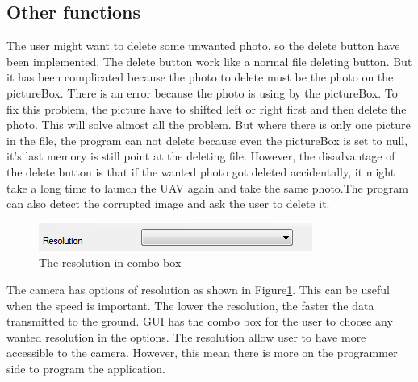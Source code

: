 \subsection{Other functions}
The user might want to delete some unwanted photo, so the delete button have been implemented. The delete button work like a normal file deleting button. But it has been complicated because the photo to delete must be the photo on the pictureBox. There is an error because the photo is using by the pictureBox. To fix this problem, the picture have to shifted left or right first and then delete the photo. This will solve almost all the problem. But where there is only one picture in the file, the program can not delete because even the pictureBox is set to null, it's last memory is still point at the deleting file. However, the disadvantage of the delete button is that if the wanted photo got deleted accidentally, it might take a long time to launch the UAV again and take the same photo.The program can also detect the corrupted image and ask the user to delete it.

\begin{figure}[H]
\begin{center}
\includegraphics[scale=1]{figures/resolutionOption.png} 
\end{center}
\caption{The resolution in combo box\label{resolutionOption}}
\end{figure}
The camera has options of resolution as shown in Figure\ref{resolutionOption}. This can be useful when the speed is important. The lower the resolution, the faster the data transmitted to the ground. GUI has the combo box for the user to choose any wanted resolution in the options. The resolution allow user to have more accessible to the camera. However, this mean there is more on the programmer side to program the application.


